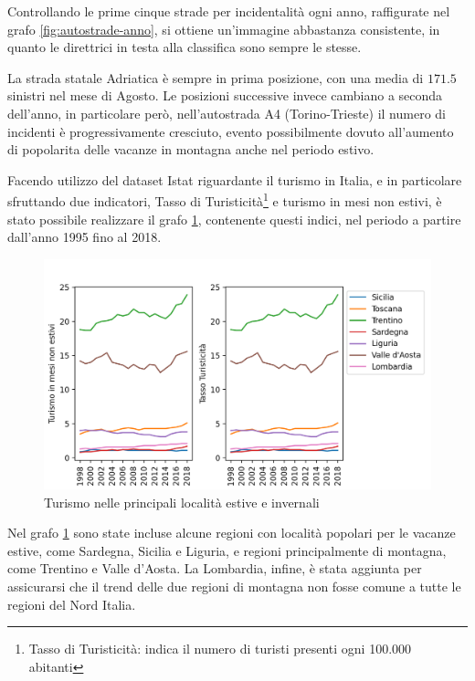 \documentclass[a4paper,12pt]{report}
\begin{document}
Controllando le prime cinque strade per incidentalità ogni anno, 
raffigurate nel grafo \ref{fig:autostrade-anno}, si ottiene un'immagine 
abbastanza consistente, in quanto le direttrici in testa alla classifica sono 
sempre le stesse.

La strada statale Adriatica è sempre in prima posizione, con una media di $171.5$ 
sinistri nel mese di Agosto.
Le posizioni successive invece cambiano a seconda dell'anno, in particolare però, 
nell'autostrada A4 (Torino-Trieste) il numero di incidenti è progressivamente cresciuto, 
evento possibilmente dovuto all'aumento di popolarita delle vacanze 
in montagna anche nel periodo estivo.

Facendo utilizzo del dataset Istat riguardante il turismo in Italia, e in 
particolare sfruttando due indicatori, Tasso di 
Turisticità\footnote{Tasso di Turisticità: indica il numero di turisti 
presenti ogni 100.000 abitanti\cite{ONTIT:1}} 
e turismo in mesi non estivi, è stato possibile realizzare il grafo \ref{fig:turismo}, 
contenente questi indici, nel periodo a partire dall'anno 1995 fino al 2018.

\begin{figure}
    \includegraphics[width=\linewidth]{../src/turismo/turismo.png}
    \caption{Turismo nelle principali località estive e invernali}
    \label{fig:turismo}
\end{figure}

Nel grafo \ref{fig:turismo} sono state incluse alcune regioni con località popolari 
per le vacanze estive, come Sardegna, Sicilia e Liguria, e regioni principalmente 
di montagna, come Trentino e Valle d'Aosta. 
La Lombardia, infine, è stata aggiunta per assicurarsi che il trend delle due regioni 
di montagna non fosse comune a tutte le regioni del Nord Italia.
\end{document}
